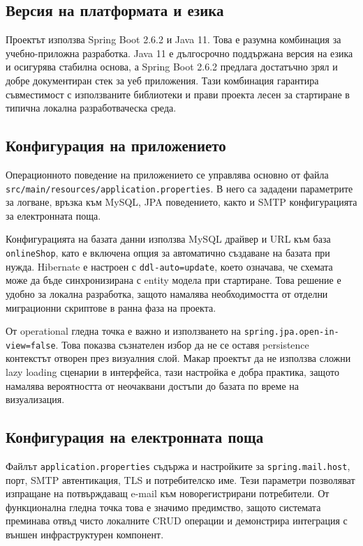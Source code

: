 \subsection{Версия на платформата и езика}

Проектът използва Spring Boot 2.6.2 и Java 11. Това е разумна комбинация за учебно-приложна разработка. Java 11 е дългосрочно поддържана версия на езика и осигурява стабилна основа, а Spring Boot 2.6.2 предлага достатъчно зрял и добре документиран стек за уеб приложения. Тази комбинация гарантира съвместимост с използваните библиотеки и прави проекта лесен за стартиране в типична локална разработваческа среда.

\subsection{Конфигурация на приложението}

Операционното поведение на приложението се управлява основно от файла \texttt{src/main/resources/application.properties}. В него са зададени параметрите за логване, връзка към MySQL, JPA поведението, както и SMTP конфигурацията за електронната поща.

Конфигурацията на базата данни използва MySQL драйвер и URL към база \texttt{onlineShop}, като е включена опция за автоматично създаване на базата при нужда. Hibernate е настроен с \texttt{ddl-auto=update}, което означава, че схемата може да бъде синхронизирана с entity модела при стартиране. Това решение е удобно за локална разработка, защото намалява необходимостта от отделни миграционни скриптове в ранна фаза на проекта.

От operational гледна точка е важно и използването на \texttt{spring.jpa.open-in-view=false}. Това показва съзнателен избор да не се оставя persistence контекстът отворен през визуалния слой. Макар проектът да не използва сложни lazy loading сценарии в интерфейса, тази настройка е добра практика, защото намалява вероятността от неочаквани достъпи до базата по време на визуализация.

\subsection{Конфигурация на електронната поща}

Файлът \texttt{application.properties} съдържа и настройките за \texttt{spring.mail.host}, порт, SMTP автентикация, TLS и потребителско име. Тези параметри позволяват изпращане на потвърждаващ e-mail към новорегистрирани потребители. От функционална гледна точка това е значимо предимство, защото системата преминава отвъд чисто локалните CRUD операции и демонстрира интеграция с външен инфраструктурен компонент.

